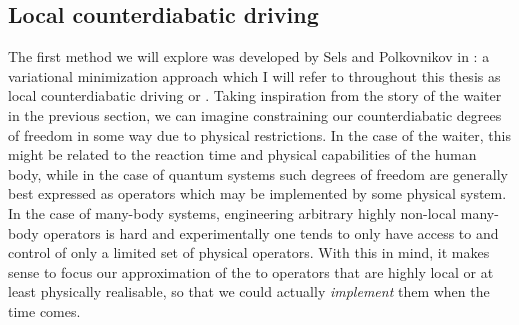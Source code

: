     \subsection{Local counterdiabatic driving}\label{sec:2.4.1_LCD}

    The first method we will explore was developed by Sels and Polkovnikov in \cite{sels_minimizing_2017}: a variational minimization approach which I will refer to throughout this thesis as local counterdiabatic driving or . Taking inspiration from the story of the waiter in the previous section, we can imagine constraining our counterdiabatic degrees of freedom in some way due to physical restrictions. In the case of the waiter, this might be related to the reaction time and physical capabilities of the human body, while in the case of quantum systems such degrees of freedom are generally best expressed as operators which may be implemented by some physical system. In the case of many-body systems, engineering arbitrary highly non-local many-body operators is hard and experimentally one tends to only have access to and control of only a limited set of physical operators. With this in mind, it makes sense to focus our approximation of the  to operators that are highly local or at least physically realisable, so that we could actually \emph{implement} them when the time comes.

